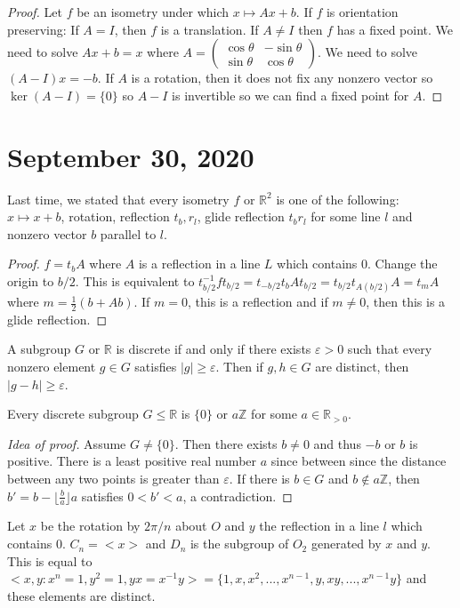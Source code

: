 \documentclass{article}
\newcommand{\R}{\mathbb{R}}
\newcommand{\Z}{\mathbb{Z}}
\newcommand{\eps}{\varepsilon}
\begin{document}
\begin{proof}
Let $f$ be an isometry under which $x\mapsto Ax+b$. If $f$ is orientation preserving: If $A=I$, then $f$ is a translation. If $A\neq I$ then $f$ has a fixed point. We need to solve $Ax+b=x$ where $A=\begin{pmatrix}
\cos\theta&-\sin\theta\\\sin\theta&\cos\theta
\end{pmatrix}$. We need to solve $(A-I)x=-b$. If $A$ is a rotation, then it does not fix any nonzero vector so $\ker(A-I)=\{0\}$ so $A-I$ is invertible so we can find a fixed point for $A$.
\end{proof}
\section{September 30, 2020}
Last time, we stated that every isometry $f$ or $\R^2$ is one of the following: $x\mapsto x+b$, rotation, reflection $t_b,r_l$, glide reflection $t_br_l$ for some line $l$ and nonzero vector $b$ parallel to $l$.
\begin{proof}
$f=t_bA$ where $A$ is a reflection in a line $L$ which contains 0. Change the origin to $b/2$. This is equivalent to $t^{-1}_{b/2}ft_{b/2}=t_{-b/2}t_bAt_{b/2}=t_{b/2}t_{A(b/2)}A=t_mA$ where $m=\frac{1}{2}(b+Ab)$. If $m=0$, this is a reflection and if $m\neq 0$, then this is a glide reflection.
\end{proof}
\begin{definition}
A subgroup $G$ or $\R$ is discrete if and only if there exists $\eps>0$ such that every nonzero element $g\in G$ satisfies $|g|\geq \eps$. Then if $g,h\in G$ are distinct, then $|g-h|\geq\eps$.
\end{definition}
\begin{theorem}
Every discrete subgroup $G\leq \R$ is $\{0\}$ or $a\Z$ for some $a\in\R_{>0}$.
\end{theorem}
\begin{proof}[Idea of proof]
Assume $G\neq\{0\}$. Then there exists $b\neq0$ and thus $-b$ or $b$ is positive. There is a least positive real number $a$ since between since the distance between any two points is greater than $\eps$. If there is $b\in G$ and $b\notin a\Z$, then $b'=b-\lfloor \frac{b}{a}\rfloor a$ satisfies $0<b'<a$, a contradiction.
\end{proof}
\begin{definition}
Let $x$ be the rotation by $2\pi/n$ about $O$ and $y$ the reflection in a line $l$ which contains 0. $C_n=<x>$ and $D_n$ is the subgroup of $O_2$ generated by $x$ and $y$.  This is equal to $<x,y:x^n=1,y^2=1,yx=x^{-1}y>=\{1,x,x^2,...,x^{n-1},y,xy,...,x^{n-1}y\}$ and these elements are distinct.
\end{definition}
\end{document}
